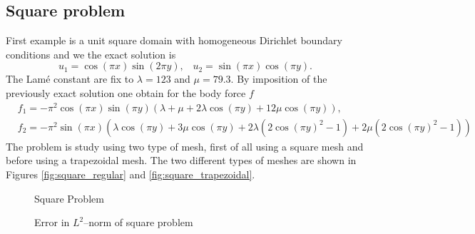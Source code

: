\documentclass[a4paper,11pt]{article}
\begin{document}
\subsection{Square problem}
First example is a unit square domain with homogeneous Dirichlet boundary conditions and we the exact solution is
\begin{equation}\label{eq:exact_solution}
u_{1} = \cos (\pi x) \sin(2\pi y), \hspace{10pt} u_{2} = \sin(\pi x)\cos(\pi y).
\end{equation} 
The Lamé constant are fix to $\lambda = 123$ and $\mu=79.3$.
By imposition of the previously exact solution one obtain for the body force $f$
\begin{equation}
\begin{split}
&f_{1} = -\pi^{2} \cos(\pi x) \sin(\pi y) \left( \lambda + \mu + 2\lambda\cos(\pi y) + 
12\mu\cos(\pi y)\right), \\
&f_{2} = -\pi^{2}\sin(\pi x)\left( \lambda\cos(\pi y) + 3\mu\cos(\pi y) + 2\lambda\left(2\cos(\pi y)^{2} 
- 1\right) + 2\mu\left(2\cos(\pi y)^{2} - 1\right) \right)
\end{split}
\end{equation}
The problem is study using two type of mesh, first of all using a square mesh and before using a trapezoidal mesh.
The two different types of meshes are shown in Figures \ref{fig:square_regular} and \ref{fig:square_trapezoidal}.
%
\begin{figure}[!ht]
\begin{center}
\hspace{5pt}
\caption{Square Problem}
\end{center}
\end{figure}
%
\begin{figure}[!ht]
\begin{center}
\caption{Error in $L^{2}$--norm of square problem}
\end{center}
\end{figure}
\end{document}
